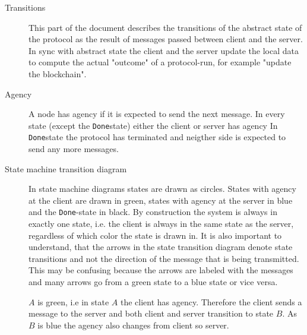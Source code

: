 \documentclass{report}
\newcommand{\wip}[1]{\color{magenta}{#1}\color{black}}
\newcommand{\state}[1]{\texttt{#1}}
\newcommand{\Done}{\state{Done}}
\theoremstyle{definition}{
  \newtheorem{lemma}{Lemma}[section] %
  \newtheorem{definition}[lemma]{Definition}
}
\theoremstyle{theorem}{
  \newtheorem{invariant}[lemma]{Invariant}
  \newtheorem{proofobligation}[lemma]{Proof Obligation}
}
\numberwithin{equation}{lemma}
\begin{document}
\begin{description}
\item[Transitions]
  This part of the document describes the transitions of the abstract state of the protocol
  as the result of messages passed between client and the server.
  In sync with abstract state the client and the server update the local data
  to compute the actual "outcome" of a protocol-run, for example "update the
  blockchain".
  \wip{WIP: there are also hard contraints on the transitions, e.g. transaction is valid,etc}

\item[Agency]
  A node has agency if it is expected to send the next message.
  In every state (except the \Done state) either the client or server has agency
  In \Done state the protocol has terminated and neigther side is expected to send any more messages.

\item [State machine transition diagram]
      In state machine diagrams states are drawn as circles.
      States with agency at the client are drawn in green, states with agency at the server in blue and
      the \Done-state in black.
      By construction the system is always in exactly one state,
      i.e. the client is always in the same state as the server,
      regardless of which color the state is drawn in.
      It is also important to understand, that the arrows in the state transition diagram denote
      state transitions and not the direction of the message that is being transmitted.
      This may be confusing because the arrows are labeled with the messages and
      many arrows go from a green state to a blue state or vice versa.

      \wip{TODO: find a latex style to mark tricky sections that must be read carefully.}


      $A$ is green, i.e in state $A$ the client has agency.
      Therefore the client sends a message to the server and
      both client and server transition to state $B$.
      As $B$ is blue the agency also changes from client so server.



\end{description}
\end{document}
